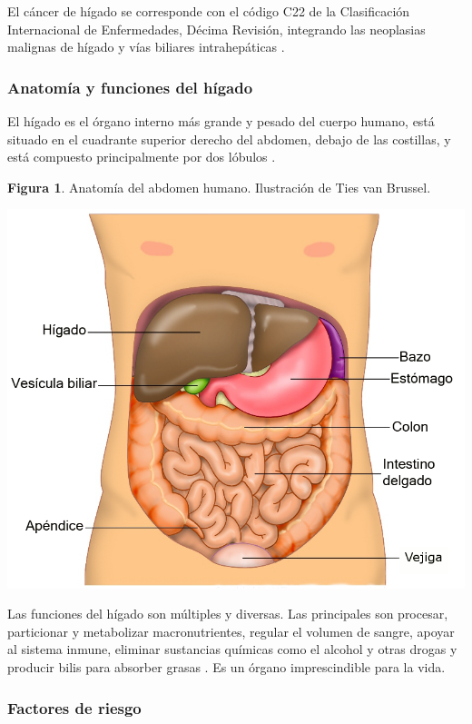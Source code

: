 El cáncer de hígado se corresponde con el código C22 de la Clasificación Internacional de Enfermedades, Décima Revisión, integrando las neoplasias malignas de hígado y vías biliares intrahepáticas \cite{ICD10, cie10es}.

\subsubsection{Anatomía y funciones del hígado}

El hígado es el órgano interno más grande y pesado del cuerpo humano, está situado en el cuadrante superior derecho del abdomen, debajo de las costillas, y está compuesto principalmente por dos lóbulos \cite{Abdel-Misih2010}.

\begin{center}
\textbf{Figura 1}. Anatomía del abdomen humano. Ilustración de Ties van Brussel.
\end{center}

\begin{center}
\includegraphics[width=.70\textwidth]{figuras/01_anatomia_higado.png} \\
\end{center}

Las funciones del hígado son múltiples y diversas. Las principales son procesar, particionar y metabolizar macronutrientes, regular el volumen de sangre, apoyar al sistema inmune, eliminar sustancias químicas como el alcohol y otras drogas y producir bilis para absorber grasas \cite{Trefts2017}. Es un órgano imprescindible para la vida.

\subsubsection{Factores de riesgo}

